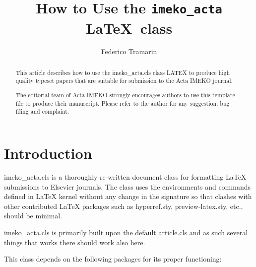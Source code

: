 \documentclass[10pt]{imeko_acta}
\def\file#1{\textsf{\fontsize{9.1}{9.5}\selectfont#1}\xspace}
\begin{document}
\title{How to Use the \texttt{imeko\_acta} \LaTeX\ class} %

\author[1,2]{Federico Tramarin}



\Funding{}%

\begin{abstract}
	This article describes how to use the imeko\_acta.cls class LATEX to produce high quality typeset papers that are suitable for submission to the Acta IMEKO journal.
	
	The editorial team of Acta IMEKO strongly encourages 
	authors to use this \LaTeXe template file to produce their manuscript.
	Please refer to the author for any suggestion, bug filing and complaint.
\end{abstract}

\maketitle

\section{Introduction}

\file{imeko\_acta.cls} is a thoroughly re-written document class
for formatting \LaTeX{} submissions to Elsevier journals.
The class uses the environments and commands defined in \LaTeX{} kernel
without any change in the signature so that clashes with other
contributed \LaTeX{} packages such as \file{hyperref.sty},
\file{preview-latex.sty}, etc., should be minimal.

\file{imeko\_acta.cls} is primarily built upon the default
\file{article.cls} and as such several things that works there should work also here.  

This class depends on the following packages
for its proper functioning:
\end{document}
